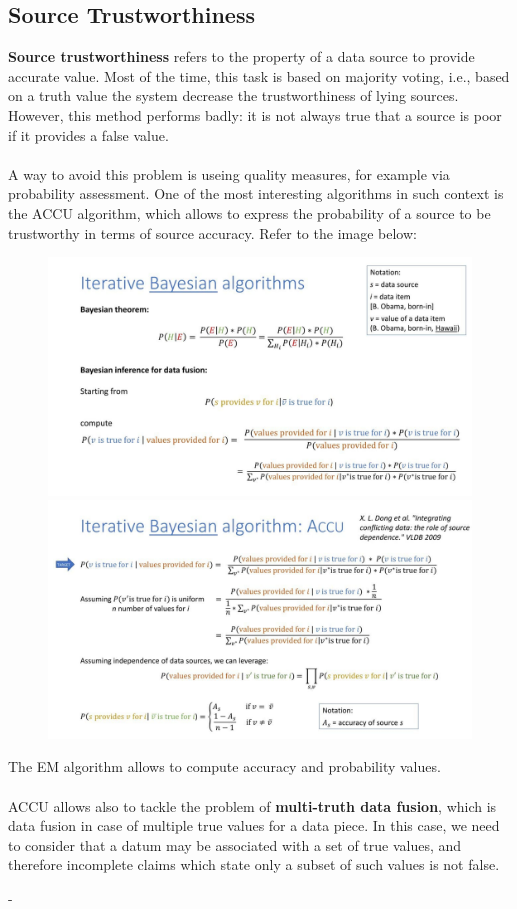 \documentclass[10pt,a4paper]{article}
\newcommand{\nline}{\\~\\}
\begin{document}
\begin{justify}
\subsection{Source Trustworthiness}
\textbf{Source trustworthiness} refers to the property of a data source to provide accurate value. Most of the time, this task is based on majority voting, i.e., based on a truth value the system decrease the trustworthiness of lying sources. However, this method performs badly: it is not always true that a source is poor if it provides a false value.\nline
A way to avoid this problem is useing quality measures, for example via probability assessment.
One of the most interesting algorithms in such context is the ACCU algorithm, which allows to express the probability of a source to be trustworthy in terms of source accuracy. Refer to the image below:
\begin{figure}[htp]
\centering
\includegraphics[width=1\textwidth]{images/ACCU1.jpg}\hfill
\includegraphics[width=1\textwidth]{images/ACCU2.jpg}\hfill
\end{figure}
The EM algorithm allows to compute accuracy and probability values.\nline
ACCU allows also to tackle the problem of \textbf{multi-truth data fusion}, which is data fusion in case of multiple true values for a data piece. In this case, we need to consider that a datum may be associated with a set of true values, and therefore incomplete claims which state only a subset of such values is not false.
\end{justify}
- 
\end{document}
